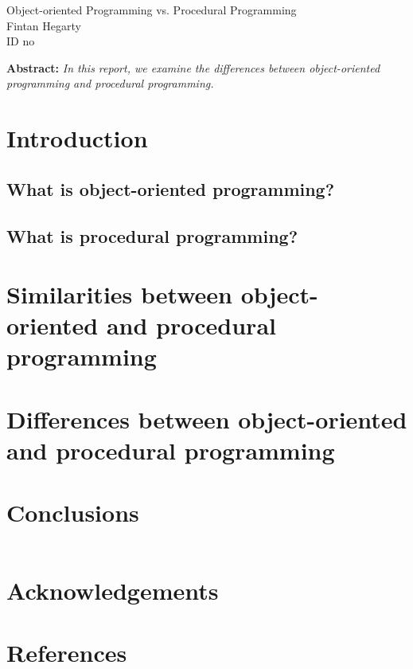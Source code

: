 \documentclass{article}
\begin{document}
\begin{center}
\Large{Object-oriented Programming vs. Procedural Programming}\\
\smallbreak
\large{Fintan Hegarty}\\
\smallbreak
\large{ID no}
\end{center}
\bigskip
\textbf{Abstract:} \textit{In this report, we examine the differences between object-oriented programming and procedural programming.}
\tableofcontents
\section{Introduction}

\subsection{What is object-oriented programming?}

\subsection{What is procedural programming?}

\section{Similarities between object-oriented and procedural programming}

\section{Differences between object-oriented and procedural programming}

\section{Conclusions}
\begin{table}
\begin{tabular}{ccc}
\end{tabular}
\end{table}

\section*{Acknowledgements}

\section*{References}
\end{document}
